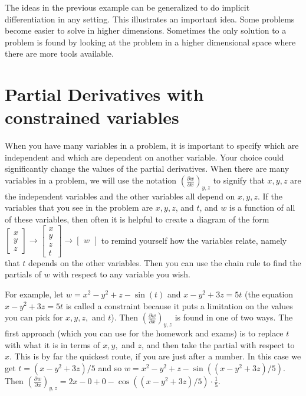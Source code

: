 The ideas in the previous example can be generalized to do implicit
differentiation in any setting. This illustrates an important
idea. Some problems become easier to solve in higher dimensions.
Sometimes the only solution to a problem is found by looking at the
problem in a higher dimensional space where there are more tools
available.


\section{Partial Derivatives with constrained variables}
When you have many variables in a problem, it is important to specify
which are independent and which are dependent on another
variable. Your choice could significantly change the values of the
partial derivatives.  When there are many variables in a problem, we
will use the notation {$\displaystyle\left(\frac{\partial w}{\partial
      x}\right)_{y,z}$} to signify that {$x,y,z$} are the independent
variables and the other variables all depend on {$x,y,z$}.  If the
variables that you see in the problem are $x,y,z$, and $t$, and $w$ is
a function of all of these variables, then often it is helpful to
create a diagram of the form $\begin{bmatrix}x\\y\\z\end{bmatrix}\to
\begin{bmatrix}x\\y\\z\\t\end{bmatrix}\to \begin{bmatrix}w\end{bmatrix}$
to remind yourself how the variables relate, namely that $t$ depends
on the other variables.  Then you can use the chain rule to find the
partials of {$w$} with respect to any variable you wish.

For example, let $w=x^2-y^2+z-\sin(t)$ and $x-y^2+3z=5t$ (the equation
$x-y^2+3z=5t$ is called a constraint because it puts a limitation on
the values you can pick for $x,y,z,$ and $t$).  Then
$\displaystyle\left(\frac{\partial w}{\partial x}\right)_{y,z}$ is found in one of
two ways.  The first approach (which you can use for the homework and
exams) is to replace $t$ with what it is in terms of $x,y,$ and $z$,
and then take the partial with respect to $x$.  This is by far the
quickest route, if you are just after a number.  In this case we get
$t=(x-y^2+3z)/5$ and so $w = x^2-y^2+z-\sin((x-y^2+3z)/5)$.  Then
$\displaystyle\left(\frac{\partial w}{\partial x}\right)_{y,z} =
2x-0+0-\cos((x-y^2+3z)/5)\cdot \frac{1}{5}$.

